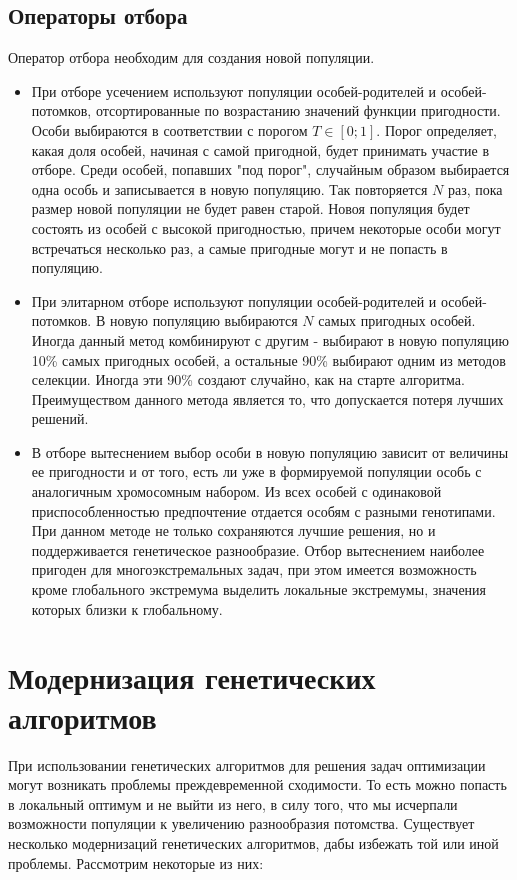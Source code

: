 \section{Операторы отбора}
Оператор отбора необходим для создания новой популяции.
\begin{itemize}[label=$\ast$]
	\item {}

При отборе усечением используют популяции особей-родителей и особей-потомков, отсортированные по возрастанию значений функции пригодности. Особи выбираются в соответствии с порогом $T \in [0;1]$. Порог определяет, какая доля особей, начиная с самой пригодной, будет принимать участие в отборе. Среди особей, попавших "под порог", случайным образом выбирается одна особь и записывается в новую популяцию. Так повторяется $N$ раз, пока размер новой популяции не будет равен старой. Новоя популяция будет состоять из особей с высокой пригодностью, причем некоторые особи могут встречаться несколько раз, а самые пригодные могут и не попасть в популяцию.
	\item {}

При элитарном отборе используют популяции особей-родителей и особей-потомков. В новую популяцию выбираются $N$ самых пригодных особей. Иногда данный метод комбинируют с другим - выбирают в новую популяцию 10\% самых пригодных особей, а остальные 90\% выбирают одним из методов селекции. Иногда эти 90\% создают случайно, как на старте алгоритма. Преимуществом данного метода является то, что допускается потеря лучших решений.
	\item {}

В отборе вытеснением выбор особи в новую популяцию зависит от величины ее пригодности и от того, есть ли уже в формируемой популяции особь с аналогичным хромосомным набором. Из всех особей с одинаковой приспособленностью предпочтение отдается особям с разными генотипами. При данном методе не только сохраняются лучшие решения, но и поддерживается генетическое разнообразие. Отбор вытеснением наиболее пригоден для многоэкстремальных задач, при этом имеется возможность кроме глобального экстремума выделить локальные экстремумы, значения которых близки к глобальному.
\end{itemize}
\chapter{Модернизация генетических алгоритмов}
При использовании генетических алгоритмов для решения задач оптимизации могут возникать проблемы преждевременной сходимости. То есть можно попасть в локальный оптимум и не выйти из него, в силу того, что мы исчерпали возможности популяции к увеличению разнообразия потомства. Существует несколько модернизаций генетических алгоритмов, дабы избежать той или иной проблемы. Рассмотрим некоторые из них:

